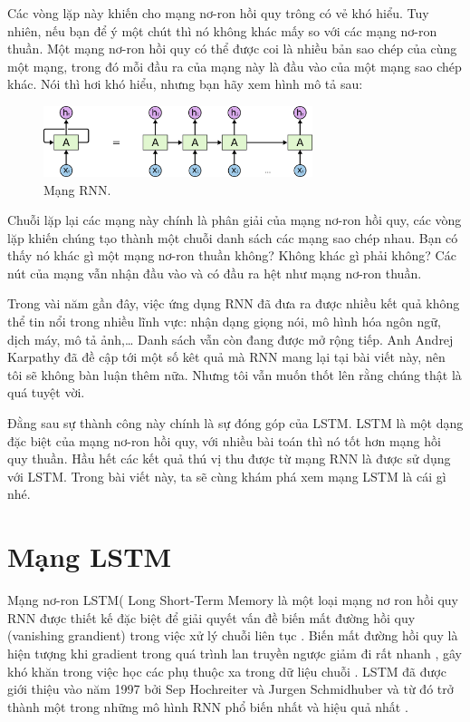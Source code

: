 Các vòng lặp này khiến cho mạng nơ-ron hồi quy trông có vẻ khó hiểu. Tuy nhiên, nếu bạn để ý một chút thì nó không khác mấy so với các mạng nơ-ron thuần. Một mạng nơ-ron hồi quy có thể được coi là nhiều bản sao chép của cùng một mạng, trong đó mỗi đầu ra của mạng này là đầu vào của một mạng sao chép khác. Nói thì hơi khó hiểu, nhưng bạn hãy xem hình mô tả sau:
\begin{figure}[h!]
	\centering
	\includegraphics[width=0.7\textwidth]{Figures/RNN-unrolled.png}
	\caption[Mạng RNN.]{Mạng RNN.}
	\label{fig:RNN-unrolled.png} 
\end{figure}
Chuỗi lặp lại các mạng này chính là phân giải của mạng nơ-ron hồi quy, các vòng lặp khiến chúng tạo thành một chuỗi danh sách các mạng sao chép nhau. Bạn có thấy nó khác gì một mạng nơ-ron thuần không? Không khác gì phải không? Các nút của mạng vẫn nhận đầu vào và có đầu ra hệt như mạng nơ-ron thuần.

Trong vài năm gần đây, việc ứng dụng RNN đã đưa ra được nhiều kết quả không thể tin nổi trong nhiều lĩnh vực: nhận dạng giọng nói, mô hình hóa ngôn ngữ, dịch máy, mô tả ảnh,… Danh sách vẫn còn đang được mở rộng tiếp. Anh Andrej Karpathy đã đề cập tới một số kêt quả mà RNN mang lại tại bài viết này, nên tôi sẽ không bàn luận thêm nữa. Nhưng tôi vẫn muốn thốt lên rằng chúng thật là quá tuyệt vời.

Đằng sau sự thành công này chính là sự đóng góp của LSTM. LSTM là một dạng đặc biệt của mạng nơ-ron hồi quy, với nhiều bài toán thì nó tốt hơn mạng hồi quy thuần. Hầu hết các kết quả thú vị thu được từ mạng RNN là được sử dụng với LSTM. Trong bài viết này, ta sẽ cùng khám phá xem mạng LSTM là cái gì nhé.
\section{Mạng LSTM}
Mạng nơ-ron LSTM( Long Short-Term Memory là một loại mạng nơ ron hồi quy RNN được thiết kế đặc biệt để giải quyết vấn đề biến mất đường hồi quy (vanishing grandient) trong việc xử lý chuỗi liên tục . Biến mất đường hồi quy là hiện tượng khi gradient trong quá trình lan truyền ngược giảm đi rất nhanh , gây khó khăn trong việc  học các phụ thuộc xa trong dữ liệu chuỗi . LSTM đã được giới thiệu vào năm 1997 bởi Sep Hochreiter và Jurgen Schmidhuber và từ đó trở thành một trong những mô hình RNN phổ biến nhất và hiệu quả nhất . 

